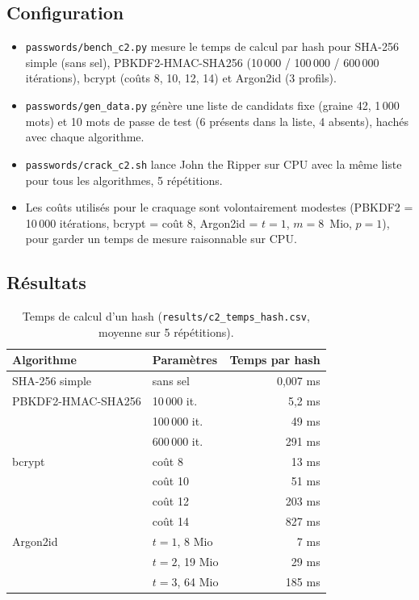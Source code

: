 \documentclass[11pt,a4paper]{article}
\newcommand{\fic}[1]{\texttt{#1}}
\begin{document}
\subsection{Configuration}
\begin{itemize}
  \item \fic{passwords/bench\_c2.py} mesure le temps de calcul par hash pour SHA-256 simple (sans
        sel), PBKDF2-HMAC-SHA256 (10\,000 / 100\,000 / 600\,000 itérations), bcrypt (coûts 8, 10,
        12, 14) et Argon2id (3 profils).
  \item \fic{passwords/gen\_data.py} génère une liste de candidats fixe (graine 42, 1\,000 mots)
        et 10 mots de passe de test (6 présents dans la liste, 4 absents), hachés avec chaque
        algorithme.
  \item \fic{passwords/crack\_c2.sh} lance John the Ripper sur CPU avec la même liste pour tous les
        algorithmes, 5 répétitions.
  \item Les coûts utilisés pour le craquage sont volontairement modestes (PBKDF2 = 10\,000
        itérations, bcrypt = coût 8, Argon2id = $t=1$, $m=8$~Mio, $p=1$), pour garder un temps de
        mesure raisonnable sur CPU.
\end{itemize}

\subsection{Résultats}

\begin{table}[H]
\centering
\begin{tabular}{l l r}
\toprule
\textbf{Algorithme} & \textbf{Paramètres} & \textbf{Temps par hash} \\
\midrule
SHA-256 simple & sans sel & 0,007 ms \\
\midrule
PBKDF2-HMAC-SHA256 & 10\,000 it. & 5,2 ms \\
 & 100\,000 it. & 49 ms \\
 & 600\,000 it. & 291 ms \\
\midrule
bcrypt & coût 8 & 13 ms \\
 & coût 10 & 51 ms \\
 & coût 12 & 203 ms \\
 & coût 14 & 827 ms \\
\midrule
Argon2id & $t=1$, 8 Mio & 7 ms \\
 & $t=2$, 19 Mio & 29 ms \\
 & $t=3$, 64 Mio & 185 ms \\
\bottomrule
\end{tabular}
\caption{Temps de calcul d'un hash (\fic{results/c2\_temps\_hash.csv}, moyenne sur 5 répétitions).}
\end{table}
\end{document}
